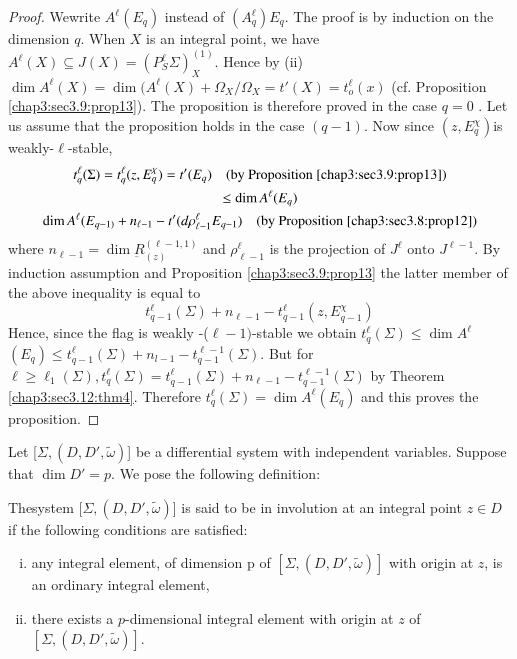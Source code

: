 \begin{proof}
  We\pageoriginale write $A^\ell(E_q)$ instead of $(A^\ell_q)E_q$. The proof is by
  induction on the dimension $q$. When $X$ is an integral point, we
  have $A^\ell(X) \subseteq J(X) = (P_S^\ell \Sigma)_X^{(1)}$. Hence by
  (ii) $\dim A^\ell (X) = \dim(A^\ell(X) + \Omega_X/\Omega_X = t' (X)=
  t_o^\ell (x)$ (cf. Proposition \ref{chap3:sec3.9:prop13}).  The proposition is therefore
  proved in the 
  case $q=0$ . Let us assume that the proposition holds in the case
  $(q-1)$. Now since $ (z,E^\chi _{q})$is weakly-$\ell $-stable, 
  \begin{gather*}
    t^\ell_q (\Sigma) = t^\ell_q(z,E^\chi _{q})=t' (E_q) \quad
    \text{(by Proposition \ref{chap3:sec3.9:prop13})}\\ 
    \leq \dim A^\ell (E_q) \\
    \dim A^\ell(E_{q-1)} + n_{\ell-1} - t' (d
    \rho^\ell_{\ell-1} E_{q-1}) \quad \text{(by
      Proposition \ref{chap3:sec3.8:prop12})} 
  \end{gather*}
  where $n_{\ell-1} = \dim \underbar{R}^{(\ell-1,1)}_(z)$ and
  $\rho^\ell_{\ell-1}$ is the projection of $J^\ell \text{ onto }
  J^{\ell-1} $. By induction assumption and
  Proposition \ref{chap3:sec3.9:prop13}  the
  latter member of the above inequality is equal to  
  $$
  t^\ell_{q-1}(\Sigma) + n_{\ell - 1 }- t^\ell_{q-1}(z,E^\chi _{q-1})
  $$ 
  Hence, since the flag is weakly -($\ell-1)$-stable we obtain
  $t^\ell_q(\Sigma) \leq \dim A^\ell$ $(E_q) \leq t^\ell_{q-1} (\Sigma)
  + n_{l-1}-t^{\ell-1}_{q-1} (\Sigma)$. But for $\ell
  \geq\ell_1 (\Sigma) , t^\ell_q (\Sigma) = t^\ell_{q-1} (\Sigma) +
  n_{\ell-1} - t^{\ell-1}_{q-1} (\Sigma) $ by Theorem \ref{chap3:sec3.12:thm4}. Therefore
  $t^\ell_q(\Sigma) = \dim A^\ell (E_q) $ and this proves the
  proposition.  
\end{proof}

Let [$\Sigma,(D,D',\tilde\omega ) $] be a differential system with
independent variables. Suppose that $\dim D' = p$. We pose the
following definition: 
\begin{defi*} 
  The\pageoriginale system [$ \Sigma,(D,D',\tilde\omega)$] is said to be in
  involution at an integral point  $z \in D $ if the following
  conditions are satisfied: 
\end{defi*}

\begin{enumerate}[(i)]
\item any integral element, of dimension p of
  $[\Sigma,(D,D',\tilde\omega)]$ with origin at $z$, is an ordinary
  integral element,  
\item there exists a $p$-dimensional integral element with origin at $z$
  of $[\Sigma,(D,D',\tilde\omega)]$. 
\end{enumerate}

